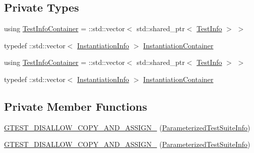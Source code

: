 \subsection*{Private Types}
\begin{DoxyCompactItemize}
\item 
using \mbox{\hyperlink{classtesting_1_1internal_1_1_parameterized_test_suite_info_a0578de1b5b1852655771349b785d7fb7}{Test\+Info\+Container}} = \+::std\+::vector$<$ std\+::shared\+\_\+ptr$<$ \mbox{\hyperlink{structtesting_1_1internal_1_1_parameterized_test_suite_info_1_1_test_info}{Test\+Info}} $>$ $>$
\item 
typedef \+::std\+::vector$<$ \mbox{\hyperlink{structtesting_1_1internal_1_1_parameterized_test_suite_info_1_1_instantiation_info}{Instantiation\+Info}} $>$ \mbox{\hyperlink{classtesting_1_1internal_1_1_parameterized_test_suite_info_a65cee35a4b9653272b6017640816eb68}{Instantiation\+Container}}
\item 
using \mbox{\hyperlink{classtesting_1_1internal_1_1_parameterized_test_suite_info_a0578de1b5b1852655771349b785d7fb7}{Test\+Info\+Container}} = \+::std\+::vector$<$ std\+::shared\+\_\+ptr$<$ \mbox{\hyperlink{structtesting_1_1internal_1_1_parameterized_test_suite_info_1_1_test_info}{Test\+Info}} $>$ $>$
\item 
typedef \+::std\+::vector$<$ \mbox{\hyperlink{structtesting_1_1internal_1_1_parameterized_test_suite_info_1_1_instantiation_info}{Instantiation\+Info}} $>$ \mbox{\hyperlink{classtesting_1_1internal_1_1_parameterized_test_suite_info_a65cee35a4b9653272b6017640816eb68}{Instantiation\+Container}}
\end{DoxyCompactItemize}
\subsection*{Private Member Functions}
\begin{DoxyCompactItemize}
\item 
\mbox{\hyperlink{classtesting_1_1internal_1_1_parameterized_test_suite_info_a2370bc6f72b85b499fa05c375358df9e}{G\+T\+E\+S\+T\+\_\+\+D\+I\+S\+A\+L\+L\+O\+W\+\_\+\+C\+O\+P\+Y\+\_\+\+A\+N\+D\+\_\+\+A\+S\+S\+I\+G\+N\+\_\+}} (\mbox{\hyperlink{classtesting_1_1internal_1_1_parameterized_test_suite_info}{Parameterized\+Test\+Suite\+Info}})
\item 
\mbox{\hyperlink{classtesting_1_1internal_1_1_parameterized_test_suite_info_a2370bc6f72b85b499fa05c375358df9e}{G\+T\+E\+S\+T\+\_\+\+D\+I\+S\+A\+L\+L\+O\+W\+\_\+\+C\+O\+P\+Y\+\_\+\+A\+N\+D\+\_\+\+A\+S\+S\+I\+G\+N\+\_\+}} (\mbox{\hyperlink{classtesting_1_1internal_1_1_parameterized_test_suite_info}{Parameterized\+Test\+Suite\+Info}})
\end{DoxyCompactItemize}
